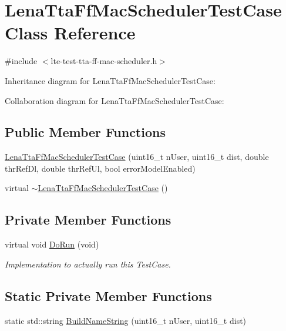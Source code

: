 \hypertarget{classLenaTtaFfMacSchedulerTestCase}{}\section{Lena\+Tta\+Ff\+Mac\+Scheduler\+Test\+Case Class Reference}
\label{classLenaTtaFfMacSchedulerTestCase}


{\ttfamily \#include $<$lte-\/test-\/tta-\/ff-\/mac-\/scheduler.\+h$>$}



Inheritance diagram for Lena\+Tta\+Ff\+Mac\+Scheduler\+Test\+Case\+:


Collaboration diagram for Lena\+Tta\+Ff\+Mac\+Scheduler\+Test\+Case\+:
\subsection*{Public Member Functions}
\begin{DoxyCompactItemize}
\item 
\hyperlink{classLenaTtaFfMacSchedulerTestCase_a8d914ad7f819ecb9732043012e5981f9}{Lena\+Tta\+Ff\+Mac\+Scheduler\+Test\+Case} (uint16\+\_\+t n\+User, uint16\+\_\+t dist, double thr\+Ref\+Dl, double thr\+Ref\+Ul, bool error\+Model\+Enabled)
\item 
virtual \hyperlink{classLenaTtaFfMacSchedulerTestCase_a9aa8a431b48ea52cc0fc9d304226a615}{$\sim$\+Lena\+Tta\+Ff\+Mac\+Scheduler\+Test\+Case} ()
\end{DoxyCompactItemize}
\subsection*{Private Member Functions}
\begin{DoxyCompactItemize}
\item 
virtual void \hyperlink{classLenaTtaFfMacSchedulerTestCase_a6c4a3631833e54ea62e6c454e937348a}{Do\+Run} (void)
\begin{DoxyCompactList}\small\item\em Implementation to actually run this Test\+Case. \end{DoxyCompactList}\end{DoxyCompactItemize}
\subsection*{Static Private Member Functions}
\begin{DoxyCompactItemize}
\item 
static std\+::string \hyperlink{classLenaTtaFfMacSchedulerTestCase_ac06e204bdf7847870332214e0f502850}{Build\+Name\+String} (uint16\+\_\+t n\+User, uint16\+\_\+t dist)
\end{DoxyCompactItemize}
